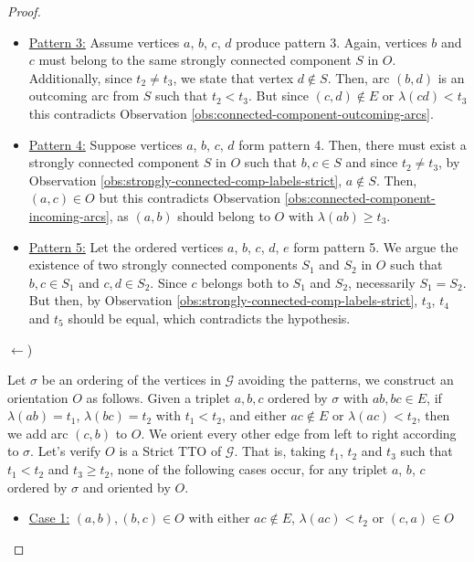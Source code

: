 \documentclass[runningheads]{llncs}
\begin{document}
\begin{proof}
\begin{itemize}
\item \underline{Pattern 3:}
Assume vertices $a$, $b$, $c$, $d$ produce pattern 3. Again, vertices $b$ and $c$ must belong to the same strongly connected component $S$ in $O$. Additionally, since $t_2 \neq t_3$, we state that vertex $d \notin S$. Then, arc $(b,d)$ is an outcoming arc from $S$ such that $t_2 < t_3$. But since $(c,d) \notin E$ or $\lambda(cd) < t_3$ this contradicts Observation \ref{obs:connected-component-outcoming-arcs}.


\item \underline{Pattern 4:}
Suppose vertices $a$, $b$, $c$, $d$ form pattern 4. Then, there must exist a strongly connected component $S$ in $O$ such that $b,c \in S$ and since $t_2 \neq t_3$, by Observation \ref{obs:strongly-connected-comp-labels-strict}, $a \notin S$. Then, $(a,c) \in O$ but this contradicts Observation \ref{obs:connected-component-incoming-arcs}, as $(a,b)$ should belong to $O$ with $\lambda(ab) \geq t_3$. 

\item \underline{Pattern 5:}
Let the ordered vertices $a$, $b$, $c$, $d$, $e$ form pattern 5. We argue the existence of two strongly connected components $S_1$ and $S_2$ in $O$ such that $b,c \in S_1$ and $c,d \in S_2$. Since $c$ belongs both to $S_1$ and $S_2$, necessarily $S_1 = S_2$. But then, by Observation \ref{obs:strongly-connected-comp-labels-strict}, $t_3$, $t_4$ and $t_5$ should be equal, which contradicts the hypothesis.

\end{itemize}

$\leftarrow$) 

Let $\sigma$ be an ordering of the vertices in $\mathcal{G}$ avoiding the patterns, we construct an orientation $O$ as follows. Given a triplet $a , b, c$ ordered by $\sigma$ with $ab,bc \in E$, if $\lambda(ab) = t_1$, $\lambda(bc) = t_2$ with $t_1 < t_2$, and either $ac\notin E$ or $\lambda(ac) < t_2$, then we add arc $(c,b)$ to $O$. We orient every other edge from left to right according to $\sigma$. Let's verify $O$ is a Strict TTO of $\mathcal{G}$. That is, taking $t_1$, $t_2$ and $t_3$ such that $t_1 < t_2$ and $t_3 \geq t_2$, none of the following cases occur, for any triplet $a$, $b$, $c$ ordered by $\sigma$ and oriented by $O$.

\begin{itemize}
\item \underline{Case 1:} $(a,b), (b,c) \in O$ with either $ac \notin E$, $\lambda(ac) < t_2$ or $(c,a) \in O$



\end{itemize}
\end{proof}
\end{document}
